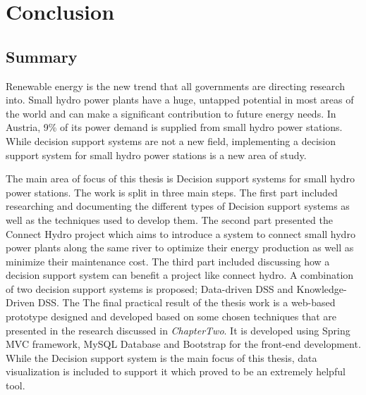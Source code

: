 \chapter{Conclusion}
\label{ChapterSeven}
\section{Summary}
\label{sec:Summary}
Renewable energy is the new trend that all governments are directing research into. Small hydro power plants have a huge, untapped potential in most areas of the world and can make a significant contribution to future energy needs. In Austria, 9\% of its power demand is supplied from small hydro power stations. While decision support systems are not a new field, implementing a decision support system for small hydro power stations is a new area of study.

The main area of focus of this thesis is Decision support systems for small hydro power stations. The work is split in three main steps. The first part included researching and documenting the different types of Decision support systems as well as the techniques used to develop them. The second part presented the Connect Hydro project which aims to introduce a system to connect small hydro power plants along the same river to optimize their energy production as well as minimize their maintenance cost. The third part included discussing how a decision support system can benefit a project like connect hydro. A combination of two decision support systems is proposed; Data-driven DSS and Knowledge-Driven DSS. The The final practical result of the thesis work is a web-based prototype designed and developed based on some chosen techniques that are presented in the research discussed in \textit{ChapterTwo}. It is developed using Spring MVC framework, MySQL Database and Bootstrap for the front-end development. While the Decision support system is the main focus of this thesis, data visualization is included to support it which proved to be an extremely helpful tool.
